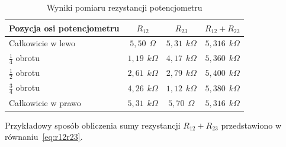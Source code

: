 \documentclass[,a4paper,12pt]{article}
\begin{document}
\begin{enumerate}
\begin{table}[H]
    \centering
    \begin{tabular}{lccc}
    \hline
    Pozycja osi potencjometru & $R_{12}$ & $R_{23}$ & $R_{12}+R_{23}$ \\ \hline
    Całkowicie w lewo & $5,50\hspace{5pt}\Omega$ & $5,31\hspace{5pt}k\Omega$ & $5,316\hspace{5pt}k\Omega$   \\
    $\frac{1}{4}$ obrotu & $1,19\hspace{5pt}k\Omega$ & $4,17\hspace{5pt}k\Omega$ & $5,360\hspace{5pt}k\Omega$   \\
    $\frac{1}{2}$ obrotu & $2,61\hspace{5pt}k\Omega$ & $2,79\hspace{5pt}k\Omega$ & $5,400\hspace{5pt}k\Omega$   \\
    $\frac{3}{4}$ obrotu & $4,26\hspace{5pt}k\Omega$ & $1,12\hspace{5pt}k\Omega$ & $5,380\hspace{5pt}k\Omega$   \\
    Całkowicie w prawo & $5,31\hspace{5pt}k\Omega$ & $5,70\hspace{5pt}\Omega$ & $5,316\hspace{5pt}k\Omega$ \\ \hline 
    \end{tabular}
    \caption{Wyniki pomiaru rezystancji potencjometru}
    \label{tab:Tabela1}
\end{table}
Przykładowy sposób obliczenia sumy rezystancji $R_{12}+R_{23}$ przedstawiono w równaniu~\eqref{eq:r12r23}.
\end{enumerate}
\end{document}
